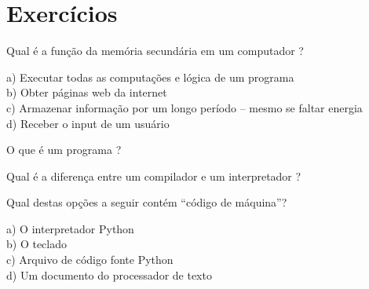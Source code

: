 \section{Exercícios}
%
%
\begin{ex}
Qual é a função da memória secundária em um computador ?

a) Executar todas as computações e lógica de um programa\\
b) Obter páginas web da internet\\
c) Armazenar informação por um longo período -- mesmo se faltar energia\\
d) Receber o input de um usuário
\end{ex}
%
%

\begin{ex}
O que é um programa ?
\end{ex}
%

\begin{ex}
Qual é a diferença entre um compilador e um interpretador ?
\end{ex}
%
%

\begin{ex}
Qual destas opções a seguir contém ``código de máquina''?

a) O interpretador Python\\
b) O teclado\\
c) Arquivo de código fonte Python\\
d) Um documento do processador de texto
\end{ex}
%
%

